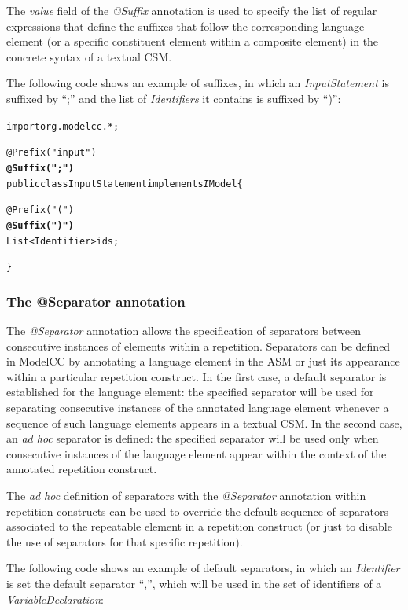 \documentclass[a4paper,twoside,onecolumn]{article}
\newenvironment{colframe}{%
  \begin{Sbox} 
    \begin{minipage}{.8\columnwidth} 
}{%

  \end{minipage} 
  \end{Sbox} 
  \begin{center} 
    \fcolorbox{black}{MyGray}{\TheSbox} 
  \end{center} 
}
\newcommand{\an}[1]{\emph{#1}} %
\begin{document}
The \emph{value} field of the \an{@Suffix} annotation is used to specify the list of regular expressions that define the suffixes that follow
the corresponding language element (or a specific constituent element within a composite element) in the concrete syntax of a textual CSM.

The following code shows an example of suffixes, in which an \emph{InputStatement} is suffixed by ``;'' and the list of \emph{Identifiers} it contains is suffixed by ``)'':

\begin{colframe}
\begin{alltt}
import org.modelcc.*;

@Prefix("input")
{\bf\unskip @Suffix(";")}
public class InputStatement implements{\emph IModel} \{

  @Prefix("(")
  {\bf\unskip @Suffix(")")}
  List<Identifier> ids;

\}
\end{alltt}
\end{colframe}

\subsubsection{The @Separator annotation}

The \an{@Separator} annotation allows the specification of separators between consecutive instances of elements within a repetition. Separators
can be defined in ModelCC by annotating a language element in the ASM or just its appearance within a particular repetition construct. In the
first case, a default separator is established for the language element: the specified separator will be used for separating consecutive
instances of the annotated language element whenever a sequence of such language elements appears in a textual CSM. In the second case, an
\emph{ad hoc} separator is defined: the specified separator will be used only when consecutive instances of the language element appear within
the context of the annotated repetition construct.

The \emph{ad hoc} definition of separators with the \an{@Separator} annotation within repetition constructs can be used to override the default
sequence of separators associated to the repeatable element in a repetition construct (or just to disable the use of separators for that
specific repetition).

The following code shows an example of default separators, in which an \emph{Identifier} is set the default separator ``,'', which will be used in the set of identifiers of a \emph{VariableDeclaration}:
\end{document}

